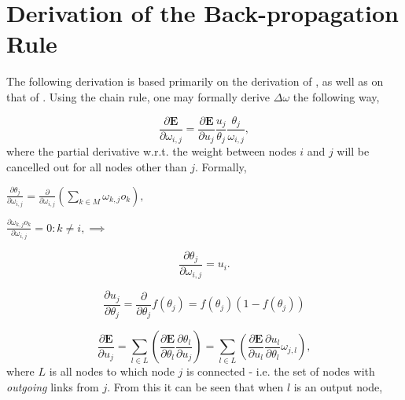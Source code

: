 \section*{Derivation of the Back-propagation Rule}\label{bptt-derivation}

The following derivation is based primarily on the derivation of \cite{Rumelhart1986}, as well as on that of \cite{Russell2009}.
Using the chain rule, one may formally derive $\Delta \omega$ the following way,

\begin{equation}
    \frac{\partial \textbf{E}}{\partial \omega_{i,j}} = \frac{\partial \textbf{E}}{\partial u_j}
    \frac{u_j}{\theta_{j}}
    \frac{\theta_{j}}{\omega_{i,j}},
\end{equation}
where the partial derivative w.r.t. the weight between nodes $i$ and $j$ will be cancelled out for all nodes other than $j$. Formally,

\begin{center}
\begin{math}
    \frac{\partial \theta_j}{\partial \omega_{i,j}} = \frac{\partial}{\partial \omega_{i,j}}(\sum_{k \in M}{} \omega_{k,j}o_k),
\end{math}
\end{center}

\begin{center}
\begin{math}
    \frac{\partial \omega_{k,j}o_k}{\partial \omega_{i,j}} = 0 : k \neq i,
    \implies
\end{math}
\end{center}
\begin{equation}
    \frac{\partial \theta_j}{\partial \omega_{i,j}} = u_i.
\end{equation}

\begin{equation}
    \frac{\partial u_j}{\partial \theta_j} = \frac{\partial}{\partial \theta_j} f(\theta_j) = f(\theta_j)(1-f(\theta_j))
\end{equation}

\begin{equation}
    \frac{\partial \textbf{E}}{\partial u_j} = \sum_{l \in L}(\frac{\partial \textbf{E}}{\partial \theta_l} 
    \frac{\partial \theta_l}{\partial u_j})
    = \sum_{l \in L}(\frac{\partial \textbf{E}}{\partial u_l} \frac{\partial u_l}{\partial \theta_l} \omega_{j,l}),
\end{equation}
where $L$ is all nodes to which node $j$ is connected - i.e. the set of nodes with \textit{outgoing} links from $j$. From this it can be seen that when $l$ is an output node,

